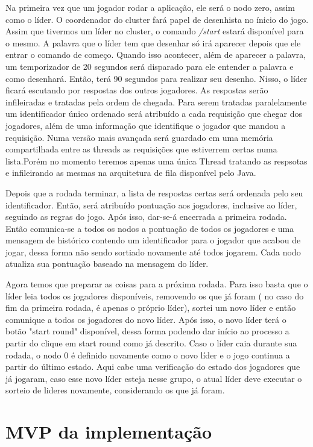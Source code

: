 \documentclass{article}
\begin{document}
Na primeira vez que um jogador rodar a aplicação, ele será o nodo zero, assim como o líder. O coordenador do cluster fará papel de desenhista no ínicio do jogo. Assim que tivermos um líder no cluster, o comando \textit{/start } estará disponível para o mesmo. A palavra que o líder tem que desenhar só irá aparecer depois que ele entrar o comando de começo. Quando isso acontecer, além de aparecer a palavra, um temporizador de 20 segundos será disparado para ele entender a palavra e como desenhará. Então, terá 90 segundos para realizar seu desenho. Nisso, o líder ficará escutando por respostas dos outros jogadores. As respostas serão infileiradas e tratadas pela ordem de chegada. Para serem tratadas paralelamente um identificador único ordenado será atribuído a cada requisição que chegar dos jogadores, além de uma informação que identifique o jogador que mandou a requisição. Numa versão mais avançada será guardado em uma memória compartilhada entre as threads as requisições que estiverrem certas numa lista.Porém no momento teremos apenas uma única Thread tratando as respsotas e infileirando as mesmas na arquitetura de fila disponível pelo Java.


Depois que a rodada terminar, a lista de respostas certas será ordenada pelo seu identificador. Então, será atribuído pontuação aos jogadores, inclusive ao líder, seguindo as regras do jogo. Após isso, dar-se-á encerrada a primeira rodada. Então comunica-se a todos os nodos a pontuação de todos os jogadores e uma mensagem de histórico contendo um identificador para o jogador que acabou de jogar, dessa forma não sendo sortiado novamente até todos jogarem. Cada nodo atualiza sua pontuação baseado na mensagem do líder. 


Agora temos que preparar as coisas para a próxima rodada. Para isso basta que o líder leia todos os jogadores disponíveis, removendo os que já foram ( no caso do fim da primeira rodada, é apenas o próprio líder), sortei um novo líder e então comunique a todos os jogadores do novo líder. Após isso, o novo líder terá o botão "start round" disponível, dessa forma podendo dar início ao processo a partir do clique em start round como já descrito. Caso o líder caia durante sua rodada, o nodo 0 é definido novamente como o novo líder e o jogo continua a partir do último estado. Aqui cabe uma verificação do estado dos jogadores que já jogaram, caso esse novo líder esteja nesse grupo, o atual líder deve executar o sorteio de lideres novamente, considerando os que já foram. 


\section{MVP da implementação}
\end{document}
